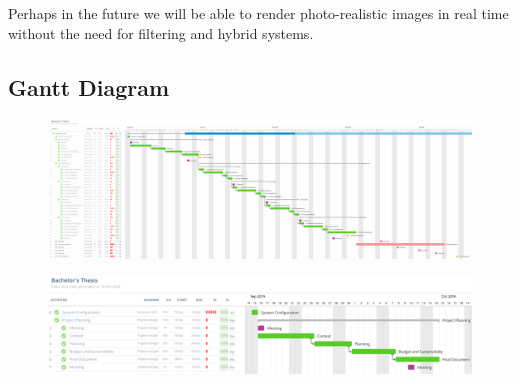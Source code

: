 \documentclass[titlepage,12pt]{report}
\begin{document}
Perhaps in the future we will be able to render photo-realistic images in real time without the need for filtering and hybrid systems.


\newpage

\printbibliography

\listoffigures

\listoftables

\begin{appendices}

\chapter{Gantt Diagram}

\uselandscape

%
%
%

\begin{figure}[H]
	\centering
	\includegraphics[scale=0.30]{media/final_gantt_esp.png}
	\label{gantt_esp}
\end{figure}

\begin{figure}[H]
	\centering
  	\includegraphics[scale=0.25]{media/gantt_gep.png}
  	\label{gantt_1}
\end{figure}


\end{appendices}
\end{document}
